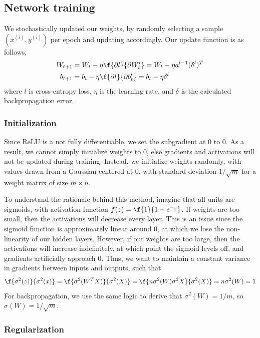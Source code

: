 \documentclass{article}
\begin{document}
\begin{multicols}{2}
\subsection{Network training}

We stochastically updated our weights,
by randomly selecting a sample $(x^{(i)}, y^{(i)})$ per epoch
and updating accordingly.
Our update function is as follows,
\begin{align}
W_{t+1} &= W_t - \eta \f{\partial l}{\partial W_t^l}
= W_t - \eta a^{l-1} (\delta^l)^T \\
b_{t+1} &= b_t - \eta \f{\partial l}{\partial b_t^l}
= b_t - \eta \delta^l
\end{align}
where $l$ is cross-entropy loss, $\eta$ is the learning rate,
and $\delta$ is the calculated backpropagation error.

\subsubsection{Initialization}

Since ReLU is a not fully differentiable,
we set the subgradient at 0 to 0.
As a result, we cannot simply initialize weights to 0,
else gradients and activations
will not be updated during training.
Instead, we initialize weights randomly,
with values drawn from a Gaussian centered at 0,
with standard deviation $1/\sqrt{m}$
for a weight matrix of size $m\times n$.

To understand the rationale behind this method,
imagine that all units are sigmoids,
with activation function $f(z) = \f{1}{1+e^{-z}}$.
If weights are too small, then the activations will decrease every layer.
This is an issue since the sigmoid function is approximately linear around 0,
at which we lose the non-linearity of our hidden layers.
However, if our weights are too large,
then the activations will increase indefinitely,
at which point the sigmoid levels off,
and gradients artificially approach 0.
Thus, we want to maintain a constant variance in gradients between
inputs and outputs, such that
\begin{equation}
\f{\sigma^2(z)}{\sigma^2(x)} = \f{\sigma^2(W^TX)}{\sigma^2(X)}
= \f{n\sigma^2(W)\sigma^2{X}}{\sigma^2(X)} = n\sigma^2(W) = 1
\end{equation}
For backpropagation, we use the same logic to derive that
$\sigma^2(W) = 1/m$, so $\sigma(W) = 1/\sqrt{m}$.

\subsubsection{Regularization}


\end{multicols}
\end{document}

